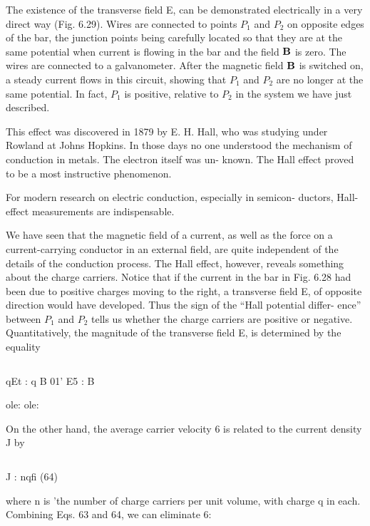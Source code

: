 The existence of the transverse field E, can be demonstrated electrically
in a very direct way (Fig. 6.29). Wires are connected to
points $P_1$ and $P_2$ on opposite edges of the bar, the junction points
being carefully located so that they are at the same potential when
current is flowing in the bar and the field $\mathbf{B}$ is zero. The wires are
connected to a galvanometer. After the magnetic field $\mathbf{B}$ is switched
on, a steady current flows in this circuit, showing that $P_1$ and $P_2$ are
no longer at the same potential. In fact, $P_1$ is positive, relative to $P_2$
in the system we have just described.

This effect was discovered in 1879 by E. H. Hall, who was studying
under Rowland at Johns Hopkins. In those days no one understood
the mechanism of conduction in metals. The electron itself was un-
known. The Hall effect proved to be a most instructive phenomenon.

 

For modern research on electric conduction, especially in semicon-
ductors, Hall-effect measurements are indispensable.

We have seen that the magnetic field of a current, as well as the
force on a current-carrying conductor in an external field, are quite
independent of the details of the conduction process. The Hall
effect, however, reveals something about the charge carriers. Notice
that if the current in the bar in Fig. 6.28 had been due to positive
charges moving to the right, a transverse field E, of opposite direction
would have developed. Thus the sign of the ``Hall potential differ-
ence'' between $P_1$ and $P_2$ tells us whether the charge carriers are positive
or negative. Quantitatively, the magnitude of the transverse
field E, is determined by the equality

\begin{equation}
\end{equation}

qEt : q B 01' E5 : B 

ole:
ole:

On the other hand, the average carrier velocity 6 is related to the
current density J by

\begin{equation}
\end{equation}

J : nqfi (64)

where n is 'the number of charge carriers per unit volume, with charge
q in each. Combining Eqs. 63 and 64, we can eliminate 6:

